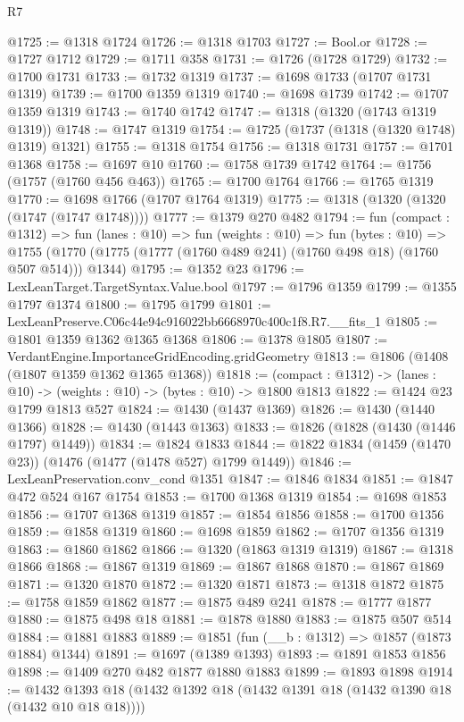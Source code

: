 \begin{lexlean}{R7}
\begin{coremodule}
@1725 := @1318 @1724
@1726 := @1318 @1703
@1727 := Bool.or
@1728 := @1727 @1712
@1729 := @1711 @358
@1731 := @1726 (@1728 @1729)
@1732 := @1700 @1731
@1733 := @1732 @1319
@1737 := @1698 @1733 (@1707 @1731 @1319)
@1739 := @1700 @1359 @1319
@1740 := @1698 @1739
@1742 := @1707 @1359 @1319
@1743 := @1740 @1742
@1747 := @1318 (@1320 (@1743 @1319 @1319))
@1748 := @1747 @1319
@1754 := @1725 (@1737 (@1318 (@1320 @1748) @1319) @1321)
@1755 := @1318 @1754
@1756 := @1318 @1731
@1757 := @1701 @1368
@1758 := @1697 @10
@1760 := @1758 @1739 @1742
@1764 := @1756 (@1757 (@1760 @456 @463))
@1765 := @1700 @1764
@1766 := @1765 @1319
@1770 := @1698 @1766 (@1707 @1764 @1319)
@1775 := @1318 (@1320 (@1320 (@1747 (@1747 @1748))))
@1777 := @1379 @270 @482
@1794 := fun (compact : @1312) =>
  fun (lanes : @10) =>
  fun (weights : @10) =>
  fun (bytes : @10) =>
  @1755 (@1770 (@1775 (@1777 (@1760 @489 @241) (@1760 @498 @18) (@1760 @507 @514))) @1344)
@1795 := @1352 @23
@1796 := LexLeanTarget.TargetSyntax.Value.bool
@1797 := @1796 @1359
@1799 := @1355 @1797 @1374
@1800 := @1795 @1799
@1801 := LexLeanPreserve.C06c44e94c916022bb6668970c400c1f8.R7.__fits_1
@1805 := @1801 @1359 @1362 @1365 @1368
@1806 := @1378 @1805
@1807 := VerdantEngine.ImportanceGridEncoding.gridGeometry
@1813 := @1806 (@1408 (@1807 @1359 @1362 @1365 @1368))
@1818 := (compact : @1312) -> (lanes : @10) -> (weights : @10) -> (bytes : @10) -> @1800 @1813
@1822 := @1424 @23 @1799 @1813 @527
@1824 := @1430 (@1437 @1369)
@1826 := @1430 (@1440 @1366)
@1828 := @1430 (@1443 @1363)
@1833 := @1826 (@1828 (@1430 (@1446 @1797) @1449))
@1834 := @1824 @1833
@1844 := @1822 @1834 (@1459 (@1470 @23)) (@1476 (@1477 (@1478 @527) @1799 @1449))
@1846 := LexLeanPreservation.conv_cond @1351
@1847 := @1846 @1834
@1851 := @1847 @472 @524 @167 @1754
@1853 := @1700 @1368 @1319
@1854 := @1698 @1853
@1856 := @1707 @1368 @1319
@1857 := @1854 @1856
@1858 := @1700 @1356
@1859 := @1858 @1319
@1860 := @1698 @1859
@1862 := @1707 @1356 @1319
@1863 := @1860 @1862
@1866 := @1320 (@1863 @1319 @1319)
@1867 := @1318 @1866
@1868 := @1867 @1319
@1869 := @1867 @1868
@1870 := @1867 @1869
@1871 := @1320 @1870
@1872 := @1320 @1871
@1873 := @1318 @1872
@1875 := @1758 @1859 @1862
@1877 := @1875 @489 @241
@1878 := @1777 @1877
@1880 := @1875 @498 @18
@1881 := @1878 @1880
@1883 := @1875 @507 @514
@1884 := @1881 @1883
@1889 := @1851 (fun (__b : @1312) => @1857 (@1873 @1884) @1344)
@1891 := @1697 (@1389 @1393)
@1893 := @1891 @1853 @1856
@1898 := @1409 @270 @482 @1877 @1880 @1883
@1899 := @1893 @1898
@1914 := @1432 @1393 @18 (@1432 @1392 @18 (@1432 @1391 @18 (@1432 @1390 @18 (@1432 @10 @18 @18))))

\end{coremodule}
\end{lexlean}
